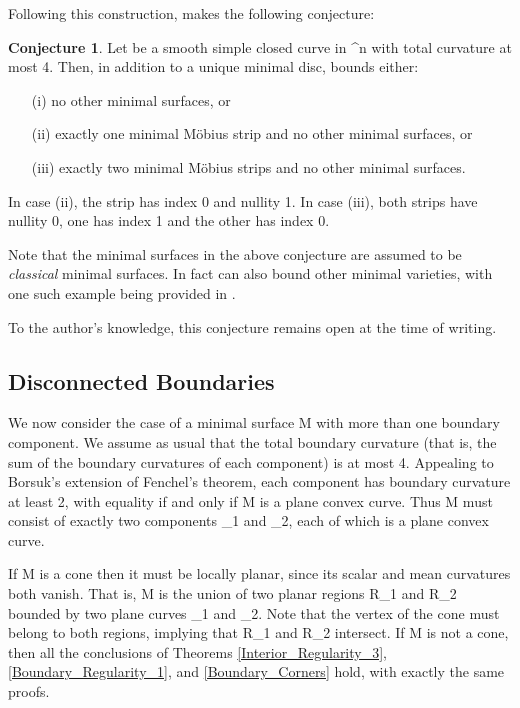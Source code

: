 \documentclass[a4paper, 11pt]{article}
\theoremstyle{plain}
\theoremstyle{definition}
\newtheorem*{conjecture}{Conjecture}
\theoremstyle{remark}
\numberwithin{equation}{subsection}
\def\({}
\def\){}
\def\pi{}
\begin{document}
Following this construction, \cite{EWW02} makes the following conjecture:

\begin{conjecture}
Let \(\Gamma\) be a smooth simple closed curve in \(^{n}\) with total curvature at most \(4\pi\). Then, in addition to a unique minimal disc, \(\Gamma\) bounds either:
\begin{enumerate}
\item[(i)] no other minimal surfaces, or
\item[(ii)] exactly one minimal M{\"o}bius strip and no other minimal surfaces, or
\item[(iii)] exactly two minimal M{\"o}bius strips and no other minimal surfaces.
\end{enumerate}
In case (ii), the strip has index \(0\) and nullity \(1\). In case (iii), both strips have nullity \(0\), one has index \(1\) and the other has index \(0\).
\end{conjecture}

Note that the minimal surfaces in the above conjecture are assumed to be \emph{classical} minimal surfaces. In fact \(\Gamma\) can also bound other minimal varieties, with one such example being provided in \cite[Section 7]{EWW02}.

To the author's knowledge, this conjecture remains open at the time of writing.

\subsection{Disconnected Boundaries}

We now consider the case of a minimal surface \(M\) with more than one boundary component. We assume as usual that the total boundary curvature (that is, the sum of the boundary curvatures of each component) is at most \(4\pi\). Appealing to Borsuk's extension of Fenchel's theorem, each component has boundary curvature at least \(2\pi\), with equality if and only if \(\partial M\) is a plane convex curve. Thus \(\partial M\) must consist of exactly two components \(\Gamma_{1}\) and \(\Gamma_{2}\), each of which is a plane convex curve.

If \(M\) is a cone then it must be locally planar, since its scalar and mean curvatures both vanish. That is, \(M\) is the union of two planar regions \(R_{1}\) and \(R_{2}\) bounded by two plane curves \(\Gamma_{1}\) and \(\Gamma_{2}\). Note that the vertex of the cone must belong to both regions, implying that \(R_{1}\) and \(R_{2}\) intersect. If \(M\) is not a cone, then all the conclusions of Theorems \ref{Interior_Regularity_3}, \ref{Boundary_Regularity_1}, and \ref{Boundary_Corners} hold, with exactly the same proofs.
\end{document}
